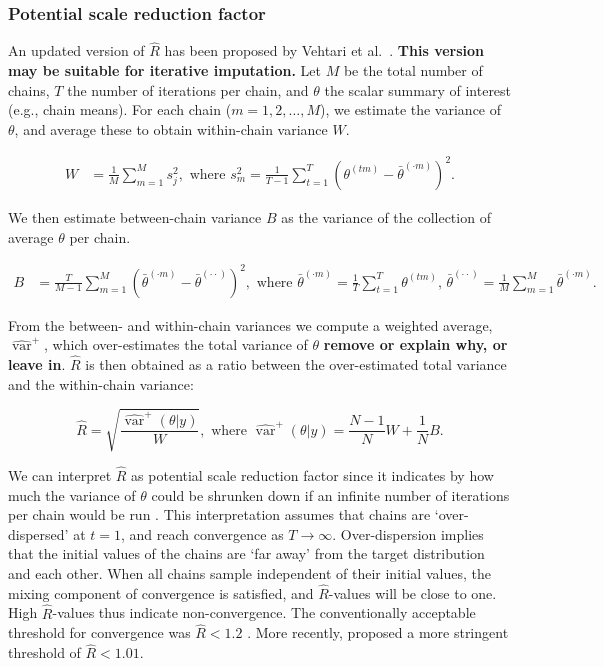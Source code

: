 \documentclass[Royal,times,sageh]{sagej}
\begin{document}
\hypertarget{potential-scale-reduction-factor}{%
\subsubsection{Potential scale reduction
factor}\label{potential-scale-reduction-factor}}

An updated version of \(\widehat{R}\) has been proposed by Vehtari et
al.~\citeyearpar[p.~5]{veht19}. \textbf{This version may be suitable for
iterative imputation.} Let \(M\) be the total number of chains, \(T\)
the number of iterations per chain, and \(\theta\) the scalar summary of
interest (e.g., chain means). For each chain (\(m = 1, 2, \dots, M\)),
we estimate the variance of \(\theta\), and average these to obtain
within-chain variance \(W\).

\begin{align*}
W&=\frac{1}{M} \sum_{m=1}^{M} s_{j}^{2}, \text { where } s_{m}^{2}=\frac{1}{T-1} \sum_{t=1}^{T}\left(\theta^{(t m)}-\bar{\theta}^{(\cdot m)}\right)^{2}. 
\end{align*}

We then estimate between-chain variance \(B\) as the variance of the
collection of average \(\theta\) per chain.

\begin{align*}
B&=\frac{T}{M-1} \sum_{m=1}^{M}\left(\bar{\theta}^{(\cdot m)}-\bar{\theta}^{(\cdot \cdot)}\right)^{2}, \text { where } \bar{\theta}^{(\cdot m)}=\frac{1}{T} \sum_{t=1}^{T} \theta^{(t m)} \text{, } \bar{\theta}^{(\cdot \cdot)}=\frac{1}{M} \sum_{m=1}^{M} \bar{\theta}^{(\cdot m)}. 
\end{align*}

From the between- and within-chain variances we compute a weighted
average, \(\widehat{\operatorname{var}}^{+}\), which over-estimates the
total variance of \(\theta\) \textbf{remove or explain why, or leave
in}. \(\widehat{R}\) is then obtained as a ratio between the
over-estimated total variance and the within-chain variance:

\begin{equation*}
\widehat{R}=\sqrt{\frac{\widehat{\operatorname{var}}^{+}(\theta | y)}{W}},
\text{ where } \widehat{\operatorname{var}}^{+}(\theta | y)=\frac{N-1}{N} W+\frac{1}{N} B.
\end{equation*}

We can interpret \(\widehat{R}\) as potential scale reduction factor
since it indicates by how much the variance of \(\theta\) could be
shrunken down if an infinite number of iterations per chain would be run
\citep{gelm92}. This interpretation assumes that chains are
`over-dispersed' at \(t=1\), and reach convergence as \(T \to \infty\).
Over-dispersion implies that the initial values of the chains are `far
away' from the target distribution and each other. When all chains
sample independent of their initial values, the mixing component of
convergence is satisfied, and \(\widehat{R}\)-values will be close to
one. High \(\widehat{R}\)-values thus indicate non-convergence. The
conventionally acceptable threshold for convergence was
\(\widehat{R} < 1.2\) \citep{gelm92}. More recently, \citet{veht19}
proposed a more stringent threshold of \(\widehat{R} < 1.01\).
\end{document}
